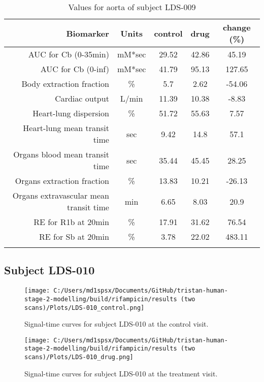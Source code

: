 \documentclass{epflreport}%
\begin{document}
\begin{longtable}{rcccc}%
\hline%
Biomarker&Units&control&drug&change (\%)\\%
\hline%
AUC for Cb (0{-}35min)&mM*sec&29.52&42.86&45.19\\%
AUC for Cb (0{-}inf)&mM*sec&41.79&95.13&127.65\\%
Body extraction fraction&\%&5.7&2.62&{-}54.06\\%
Cardiac output&L/min&11.39&10.38&{-}8.83\\%
Heart{-}lung dispersion&\%&51.72&55.63&7.57\\%
Heart{-}lung mean transit time&sec&9.42&14.8&57.1\\%
Organs blood mean transit time&sec&35.44&45.45&28.25\\%
Organs extraction fraction&\%&13.83&10.21&{-}26.13\\%
Organs extravascular mean transit time&min&6.65&8.03&20.9\\%
RE for R1b at 20min&\%&17.91&31.62&76.54\\%
RE for Sb at 20min&\%&3.78&22.02&483.11\\%
\hline%
\caption{Values for aorta of subject LDS-009} \\%
\end{longtable}%
\clearpage%
\subsection{Subject LDS{-}010}%
\label{subsec:SubjectLDS{-}010}%

%


\begin{figure}[h!]%
\centering%
\texttt{[image: C:/Users/md1spsx/Documents/GitHub/tristan-human-stage-2-modelling/build/rifampicin/results (two scans)/Plots/LDS-010\_control.png]}%
\caption{Signal{-}time curves for subject LDS{-}010 at the control visit.}%
\end{figure}

%


\begin{figure}[h!]%
\centering%
\texttt{[image: C:/Users/md1spsx/Documents/GitHub/tristan-human-stage-2-modelling/build/rifampicin/results (two scans)/Plots/LDS-010\_drug.png]}%
\caption{Signal{-}time curves for subject LDS{-}010 at the treatment visit.}%
\end{figure}
\end{document}
